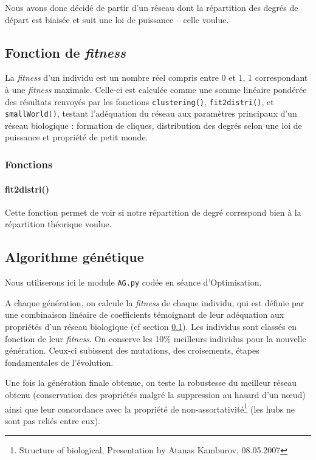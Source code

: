 Nous avons donc décidé de partir d'un réseau dont la répartition des degrés de départ est biaisée et suit une loi de puissance -- celle voulue.

\subsection{Fonction de \textit{fitness} }
\label{fitness}
La \textit{fitness} d'un individu est un nombre réel compris entre $0$ et $1$, $1$ correspondant à une \textit{fitness} maximale.
Celle-ci est calculée comme une somme linéaire pondérée des résultats renvoyés par les fonctions \texttt{clustering()}, \texttt{fit2distri()}, et \texttt{smallWorld()}, testant l'adéquation du réseau aux paramètres principaux d'un réseau biologique : formation de cliques, distribution des degrés selon une loi de puissance et propriété de petit monde.

\subsubsection{Fonctions}
\paragraph*{fit2distri()} Cette fonction permet de voir si notre répartition de degré correspond bien à la répartition théorique voulue.

\subsection{Algorithme génétique}
Nous utiliserons ici le module \texttt{AG.py} codée en séance d'Optimisation. 

A chaque génération, on calcule la \textit{fitness} de chaque individu, qui est définie par une combinaison linéaire de coefficients témoignant de leur adéquation aux propriétés d'un réseau biologique (cf section \ref{fitness}).
Les individus sont classés en fonction de leur \textit{fitness}. On conserve les 10\% meilleurs individus pour la nouvelle génération. Ceux-ci subissent des mutations, des croisements, étapes fondamentales de l'évolution.

Une fois la génération finale obtenue, on teste la robustesse du meilleur réseau obtenu (conservation des propriétés malgré la suppression au hasard d'un nœud) ainsi que leur concordance avec la propriété de non-assortativité\footnote{Structure of biological, Presentation by Atanas Kamburov, 08.05.2007} (les hubs ne sont pas reliés entre eux).

